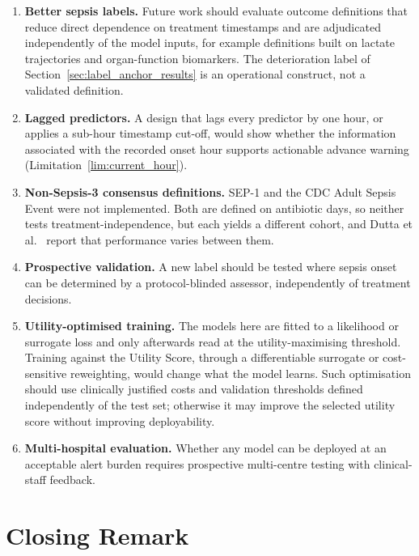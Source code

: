 \begin{enumerate}
    \item \textbf{Better sepsis labels.} Future work should evaluate outcome
    definitions that reduce direct dependence on treatment timestamps and are
    adjudicated independently of the model inputs, for example definitions
    built on lactate trajectories and organ-function biomarkers. The
    deterioration label of Section~\ref{sec:label_anchor_results} is an
    operational construct, not a validated definition.

    \item \textbf{Lagged predictors.} A design that lags every predictor by one
    hour, or applies a sub-hour timestamp cut-off, would show whether the
    information associated with the recorded onset hour supports actionable
    advance warning (Limitation~\ref{lim:current_hour}).

    \item \textbf{Non-Sepsis-3 consensus definitions.} SEP-1 and the CDC Adult
    Sepsis Event were not implemented. Both are defined on antibiotic days, so
    neither tests treatment-independence, but each yields a different cohort,
    and Dutta et al.\ \cite{dutta2026performance} report that performance
    varies between them.

    \item \textbf{Prospective validation.} A new label should be tested where
    sepsis onset can be determined by a protocol-blinded assessor,
    independently of treatment decisions.

    \item \textbf{Utility-optimised training.} The models here are fitted to a
    likelihood or surrogate loss and only afterwards read at the
    utility-maximising threshold. Training against the Utility Score, through a
    differentiable surrogate or cost-sensitive reweighting, would change what
    the model learns. Such optimisation should use clinically justified costs
    and validation thresholds defined independently of the test set; otherwise
    it may improve the selected utility score without improving
    deployability.

    \item \textbf{Multi-hospital evaluation.} Whether any model can be
    deployed at an acceptable alert burden requires prospective multi-centre
    testing with clinical-staff feedback.
\end{enumerate}


\section{Closing Remark}

